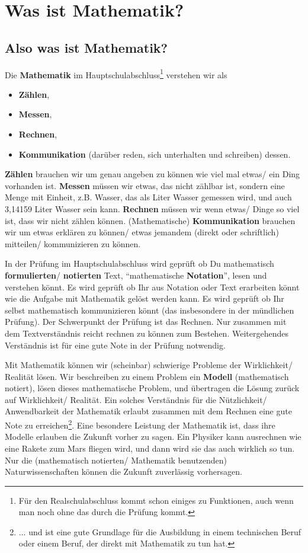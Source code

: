 \documentclass[a4paper]{book}%
\theoremstyle{definition}
\begin{document}
\chapter{Was ist Mathematik?}

\section{Also was ist Mathematik?}

Die \textbf{Mathematik} im Hauptschulabschluss\footnote{Für den Realschulabschluss kommt schon einiges zu Funktionen, auch wenn man noch ohne das durch die Prüfung kommt.} verstehen wir als
\begin{itemize}
  \item \textbf{Zählen},
  \item \textbf{Messen},
  \item \textbf{Rechnen},
  \item \textbf{Kommunikation} (darüber reden, sich unterhalten und schreiben) dessen.
\end{itemize}

\textbf{Zählen} brauchen wir um genau angeben zu können wie viel mal etwas/ ein Ding vorhanden ist. \textbf{Messen} müssen wir etwas, das nicht zählbar ist, sondern eine Menge mit Einheit, z.B. Wasser, das als Liter Wasser gemessen wird, und auch 3,14159 Liter Wasser sein kann. \textbf{Rechnen} müssen wir wenn etwas/ Dinge so viel ist, dass wir nicht zählen können. (Mathematische) \textbf{Kommunikation} brauchen wir um etwas erklären zu können/ etwas jemandem (direkt oder schriftlich) mitteilen/ kommunizieren zu können.

In der Prüfung im Hauptschulabschluss wird geprüft ob Du mathematisch \textbf{formulierten}/ \textbf{notierten} Text, \enquote{mathematische \textbf{Notation}}, lesen und verstehen könnt. Es wird geprüft ob Ihr aus Notation oder Text erarbeiten könnt wie die Aufgabe mit Mathematik gelöst werden kann. Es wird geprüft ob Ihr selbst mathematisch kommunizieren könnt (das insbesondere in der mündlichen Prüfung). Der Schwerpunkt der Prüfung ist das Rechnen. Nur zusammen mit dem Textverständnis reicht rechnen zu können zum Bestehen. Weitergehendes Verständnis ist für eine gute Note in der Prüfung notwendig.

Mit Mathematik können wir (scheinbar) schwierige Probleme der Wirklichkeit/ Realität lösen. Wir beschreiben zu einem Problem ein \textbf{Modell} (mathematisch notiert), lösen dieses mathematische Problem, und übertragen die Lösung zurück auf Wirklichkeit/ Realität. Ein solches Verständnis für die Nützlichkeit/ Anwendbarkeit der Mathematik erlaubt zusammen mit dem Rechnen eine gute Note zu erreichen\footnote{... und ist eine gute Grundlage für die Ausbildung in einem technischen Beruf oder einem Beruf, der direkt mit Mathematik zu tun hat.}. Eine besondere Leistung der Mathematik ist, dass ihre Modelle erlauben die Zukunft vorher zu sagen. Ein Physiker kann ausrechnen wie eine Rakete zum Mars fliegen wird, und dann wird sie das auch wirklich so tun. Nur die (mathematisch notierten/ Mathematik benutzenden) Naturwissenschaften können die Zukunft zuverlässig vorhersagen.
\end{document}
